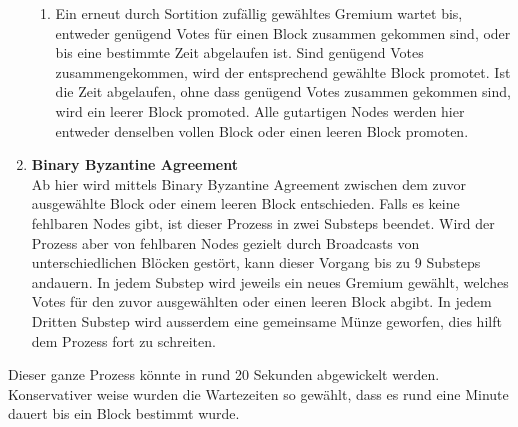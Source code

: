 \documentclass[11pt,a4paper]{article}
\begin{document}
\begin{enumerate}[label=\arabic*)]
\begin{enumerate}[label=\Roman*)]
		\item Ein erneut durch Sortition zuf\"allig gew\"ahltes Gremium wartet bis, entweder gen\"ugend Votes f\"ur einen Block zusammen gekommen sind, oder bis eine bestimmte Zeit abgelaufen ist.
		Sind gen\"ugend Votes zusammengekommen, wird der entsprechend gew\"ahlte Block promotet.
		Ist die Zeit abgelaufen, ohne dass gen\"ugend Votes zusammen gekommen sind, wird ein leerer Block promoted.
		Alle gutartigen Nodes werden hier entweder denselben vollen Block oder einen leeren Block promoten.
	\end{enumerate}
	\item \textbf{Binary Byzantine Agreement}\\
	Ab hier wird mittels Binary Byzantine Agreement zwischen dem zuvor ausgew\"ahlte Block oder einem leeren Block entschieden.
	Falls es keine fehlbaren Nodes gibt, ist dieser Prozess in zwei Substeps beendet.
	Wird der Prozess aber von fehlbaren Nodes gezielt durch Broadcasts von unterschiedlichen Bl\"ocken gest\"ort,
	kann dieser Vorgang bis zu 9 Substeps andauern.
	In jedem Substep wird jeweils ein neues Gremium gew\"ahlt,
	welches Votes f\"ur den zuvor ausgew\"ahlten oder einen leeren Block abgibt.
	In jedem Dritten Substep wird ausserdem eine \grqq{}gemeinsame\grqq{} M\"unze geworfen,
	dies hilft dem Prozess fort zu schreiten.
\end{enumerate}
Dieser ganze Prozess k\"onnte in rund 20 Sekunden abgewickelt werden.
Konservativer weise wurden die Wartezeiten so gew\"ahlt, dass es rund eine Minute dauert bis ein Block bestimmt wurde.

\end{document}
